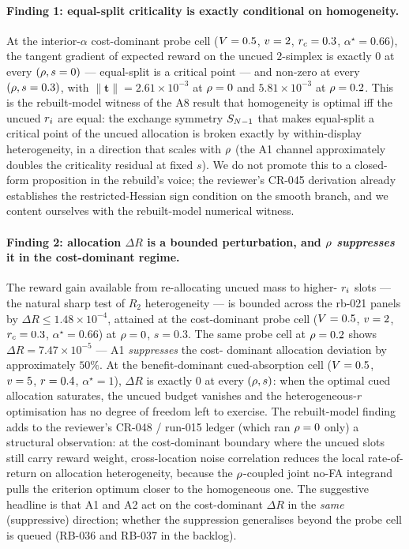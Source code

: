 \paragraph{Finding 1: equal-split criticality is exactly conditional on
homogeneity.}
At the interior-$\alpha$ cost-dominant probe cell ($V = 0.5$,
$v = 2$, $r_c = 0.3$, $\alpha^\star = 0.66$), the tangent
gradient of expected reward on the uncued $2$-simplex is exactly $0$
at every $(\rho, s = 0)$ — equal-split is a critical point — and
non-zero at every $(\rho, s = 0.3)$, with $\|\boldsymbol{t}\| =
2.61\!\times\!10^{-3}$ at $\rho = 0$ and $5.81\!\times\!10^{-3}$ at
$\rho = 0.2$. This is the rebuilt-model witness of the A8 result
that homogeneity is optimal iff the uncued $r_i$ are equal: the
exchange symmetry $S_{N - 1}$ that makes equal-split a critical
point of the uncued allocation is broken exactly by within-display
heterogeneity, in a direction that scales with $\rho$ (the A1
channel approximately doubles the criticality residual at fixed $s$).
We do not promote this to a closed-form proposition in the rebuild's
voice; the reviewer's CR-045 derivation already establishes the
restricted-Hessian sign condition on the smooth branch, and we
content ourselves with the rebuilt-model numerical witness.

\paragraph{Finding 2: allocation $\Delta R$ is a bounded perturbation,
and $\rho$ \emph{suppresses} it in the cost-dominant regime.}
The reward gain available from re-allocating uncued mass to higher-
$r_i$ slots — the natural sharp test of $R_2$ heterogeneity — is
bounded across the rb-021 panels by $\Delta R \le
1.48\!\times\!10^{-4}$, attained at the cost-dominant probe cell
($V = 0.5$, $v = 2$, $r_c = 0.3$, $\alpha^\star = 0.66$)
at $\rho = 0$, $s = 0.3$. The same probe cell at $\rho = 0.2$ shows
$\Delta R = 7.47\!\times\!10^{-5}$ — A1 \emph{suppresses} the cost-
dominant allocation deviation by approximately $50\%$. At the
benefit-dominant cued-absorption cell ($V = 0.5$, $v = 5$,
$r = 0.4$, $\alpha^\star = 1$), $\Delta R$ is exactly $0$ at
every $(\rho, s)$: when the optimal cued allocation saturates, the
uncued budget vanishes and the heterogeneous-$r$ optimisation
has no degree of freedom left to exercise. The rebuilt-model finding
adds to the reviewer's CR-048 / run-015 ledger (which ran $\rho = 0$
only) a structural observation: at the cost-dominant boundary where
the uncued slots still carry reward weight, cross-location noise
correlation reduces the local rate-of-return on allocation
heterogeneity, because the $\rho$-coupled joint no-FA integrand
pulls the criterion optimum closer to the homogeneous one. The
suggestive headline is that A1 and A2 act on the cost-dominant
$\Delta R$ in the \emph{same} (suppressive) direction; whether the
suppression generalises beyond the probe cell is queued (RB-036 and
RB-037 in the backlog).

